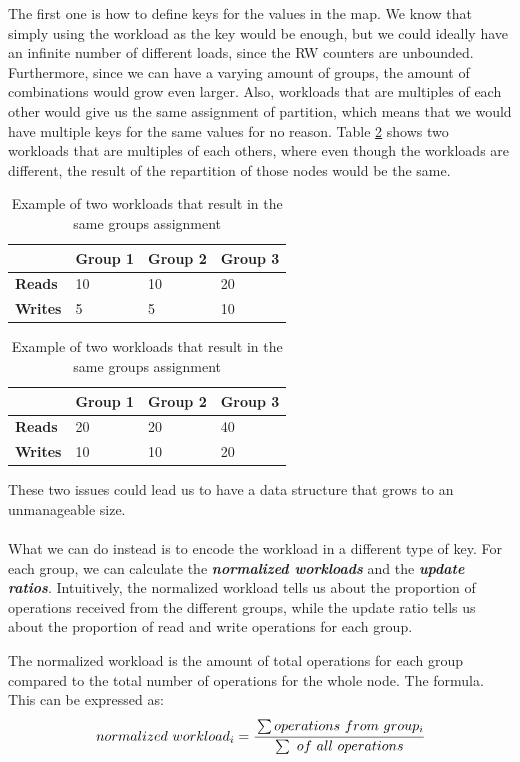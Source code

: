 The first one is how to define keys for the values in the map. We know that simply using the workload as the key would be enough, but we could ideally have an infinite number of different loads, since the RW counters are unbounded. Furthermore, since we can have a varying amount of groups, the amount of combinations would grow even larger. Also, workloads that are multiples of each other would give us the same assignment of partition, which means that we would have multiple keys for the same values for no reason. Table \ref{tab:lru-multiple-workload} shows two workloads that are multiples of each others, where even though the workloads are different, the result of the repartition of those nodes would be the same.

\begin{table}[!htb]
  \centering
  \begin{tabular}{l l l l}
    \hline
    & \textbf{Group 1} & \textbf{Group 2} & \textbf{Group 3} \\
    \hline
    \textbf{Reads} & 10 & 10 & 20 \\
    \textbf{Writes} & 5 & 5 & 10 \\
    \hline
  \end{tabular}

  \begin{tabular}{l l l l}
    \hline
    & \textbf{Group 1} & \textbf{Group 2} & \textbf{Group 3} \\
    \hline
    \textbf{Reads} & 20 & 20 & 40 \\
    \textbf{Writes} & 10 & 10 & 20 \\

  \end{tabular}
  \caption{Example of two workloads that result in the same groups assignment}\label{tab:lru-multiple-workload}
\end{table}

These two issues could lead us to have a data structure that grows to an unmanageable size.
\\\\
What we can do instead is to encode the workload in a different type of key. For each group, we can calculate the \textbf{\emph{normalized workloads}} and the \textbf{\emph{update ratios}}. Intuitively, the normalized workload tells us about the proportion of operations received from the different groups, while the update ratio tells us about the proportion of read and write operations for each group.

The normalized workload is the amount of total operations for each group compared to the total number of operations for the whole node. The formula. This can be expressed as:
\begin{equation} \label{eq:normalized_workload}
  normalized\ workload_i =  \cfrac{\sum operations\ from\ group_i}{\sum\ of\ all\ operations}
\end{equation}

